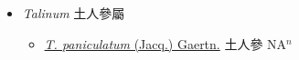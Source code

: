 
  \begin{itemize}
 \item[] \textit{Talinum} 土人參屬
                    
  \begin{itemize}
        \item[] \href{http://www.theplantlist.org/tpl1.1/search?q=Talinum+paniculatum}{\textit{T. paniculatum} (Jacq.) Gaertn.}   土人參 NA$^n$
  \end{itemize}
  \end{itemize}
